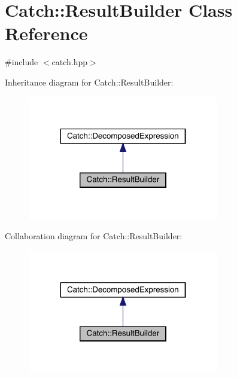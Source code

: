 \hypertarget{class_catch_1_1_result_builder}{}\section{Catch\+:\+:Result\+Builder Class Reference}
\label{class_catch_1_1_result_builder}


{\ttfamily \#include $<$catch.\+hpp$>$}



Inheritance diagram for Catch\+:\+:Result\+Builder\+:
\nopagebreak
\begin{figure}[H]
\begin{center}
\leavevmode
\includegraphics[width=236pt]{class_catch_1_1_result_builder__inherit__graph}
\end{center}
\end{figure}


Collaboration diagram for Catch\+:\+:Result\+Builder\+:
\nopagebreak
\begin{figure}[H]
\begin{center}
\leavevmode
\includegraphics[width=236pt]{class_catch_1_1_result_builder__coll__graph}
\end{center}
\end{figure}
